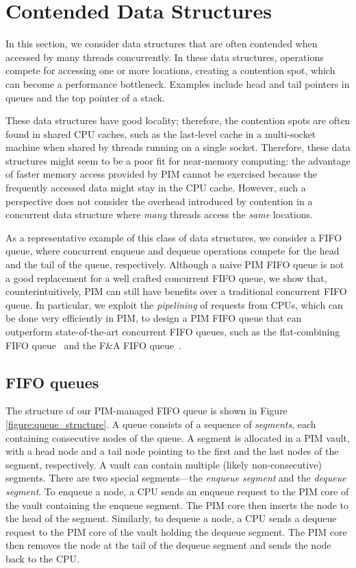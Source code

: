 
\section{Contended Data Structures}
\label{section:contended}
In this section, we consider data structures that are often contended when accessed 
by many threads concurrently. In these data structures, operations compete for accessing one or more 
locations, creating a contention spot, which can become a performance bottleneck.
Examples include head and tail pointers in queues and the top pointer of a stack.

These data structures have good locality; therefore, the contention spots are often found 
in shared CPU caches, such as the last-level cache in a multi-socket machine 
when shared by threads running on a single socket. Therefore, these data structures might 
seem to be a poor fit for near-memory computing: the advantage of faster memory access provided by PIM 
cannot be exercised because the frequently accessed data might stay in the CPU cache. 
However, such a perspective does not consider the overhead introduced by contention 
in a concurrent data structure where \emph{many} threads access the \emph{same} locations. 

As a representative example of this class of data structures, we consider a FIFO queue, 
where concurrent enqueue
and dequeue operations compete for the head and the tail of the queue, respectively. 
Although a naive PIM FIFO queue is not a good replacement for a well crafted concurrent FIFO queue, 
we show that, counterintuitively, PIM can still have benefits over a traditional concurrent FIFO 
queue. In particular, we exploit the \emph{pipelining} of requests from CPUs, 
which can be done very efficiently in PIM, to design a PIM FIFO queue that can outperform 
state-of-the-art concurrent FIFO queues, such as the flat-combining FIFO queue~\cite{Hendler10} 
and the F\&A FIFO queue~\cite{Morrison13}.

\subsection{FIFO queues}
The structure of our PIM-managed FIFO queue is shown in Figure \ref{figure:queue_structure}.
A queue consists of a sequence of \emph{segments}, each containing consecutive nodes of the queue.
A segment is allocated in a PIM vault, with a head node and a tail node pointing to the first 
and the last nodes of the segment, respectively.
A vault can contain multiple (likely non-consecutive) segments. 
There are two special segments---the \textit{enqueue segment} and the \textit{dequeue segment}.
To enqueue a node, a CPU sends an enqueue request to the PIM core of the vault 
containing the enqueue segment.
The PIM core then inserts the node to the head of the segment.
Similarly, to dequeue a node, a CPU sends a dequeue request to the PIM core of the vault
holding the dequeue segment. 
The PIM core then removes the node at the tail of the dequeue segment and 
sends the node back to the CPU.

